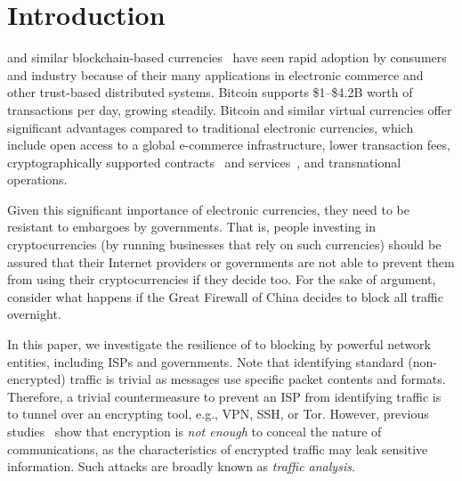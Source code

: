 
\section{Introduction}

\bc and similar blockchain-based currencies~\cite{nakamoto2008bitcoin} have  
seen rapid adoption by consumers and industry because of their many applications in
electronic commerce and other trust-based distributed systems. 
Bitcoin
supports \$1--\$4.2B worth of transactions per day, growing
steadily. Bitcoin and similar virtual
currencies offer significant advantages compared to
traditional electronic currencies, which include
open access to a global e-commerce infrastructure,
lower transaction fees, cryptographically supported
contracts~\cite{Andrychowicz:2014} and services~\cite{Miller:2014},
and transnational operations.

Given this significant importance of electronic currencies,
they need to be resistant to embargoes by governments.  
That is, people investing in cryptocurrencies (by running businesses that rely on such currencies) 
should be assured that their Internet providers or governments are not able to prevent them from 
using their cryptocurrencies if they decide too.
For the sake of argument, consider what happens if the Great Firewall of China
decides to block all \bc traffic overnight.%


In this paper, we investigate the resilience of \bc to blocking by powerful network 
entities, including  ISPs and governments. 
Note that identifying standard (non-encrypted) \bc traffic is trivial 
as \bc messages use specific packet contents and formats.
Therefore, a trivial countermeasure to prevent an ISP from identifying \bc traffic is to 
tunnel \bc over an encrypting tool, e.g., VPN, SSH, or Tor. 
However, previous studies~\cite{wright2007language,fing-attacks-defenses} show that encryption is \emph{not enough} to conceal the
nature of communications, as the characteristics of encrypted traffic may leak sensitive information.  Such attacks are broadly known as \emph{traffic analysis}.


